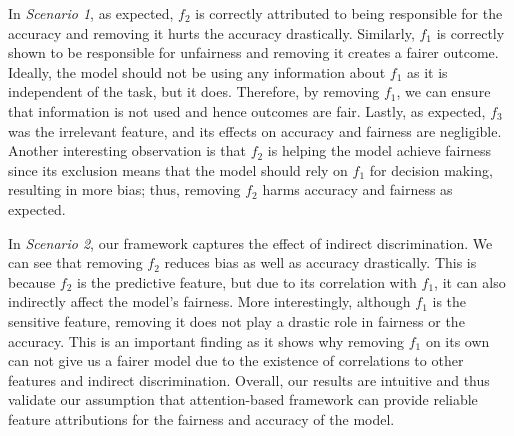 In \textit{Scenario 1}, as expected, $f_2$ is correctly attributed to being responsible for the accuracy and removing it hurts the accuracy drastically. Similarly, $f_1$ is correctly shown to be responsible for unfairness and removing it creates a fairer outcome. Ideally, the model should not be using any information about $f_1$ as it is independent of the task, but it does. Therefore, by removing $f_1$, we can ensure that information is not used and hence outcomes are fair. Lastly, as expected, $f_3$ was the irrelevant feature, and its effects on accuracy and fairness are negligible. Another interesting observation is that $f_2$ is helping the model achieve fairness since its exclusion means that the model should rely on $f_1$ for decision making, resulting in more bias; thus, removing $f_2$ harms accuracy and fairness as expected.

In \textit{Scenario 2}, our framework captures the effect of indirect discrimination. We can see that removing $f_2$  reduces bias as well as accuracy drastically. This is because $f_2$ is the predictive feature, but due to its correlation with $f_1$, it can also indirectly affect the model's fairness. More interestingly, although $f_1$ is the sensitive feature, removing it does not play a drastic role in fairness or the accuracy. This is an important finding as it shows why removing $f_1$ on its own can not give us a fairer model due to the existence of correlations to other features and indirect discrimination. Overall, our results are intuitive and thus validate our assumption that attention-based framework  can provide reliable feature attributions for the fairness and accuracy of the model. 



